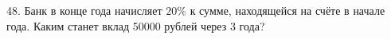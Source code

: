 48. Банк в конце года начисляет $20\%$ к сумме, находящейся на счёте в начале года. Каким станет вклад 50000 рублей через 3 года?\\
